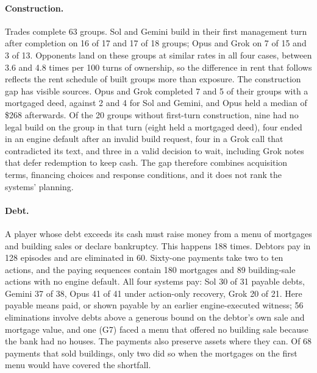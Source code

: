 \documentclass[11pt,letterpaper]{article}
\begin{document}
\paragraph{Construction.} Trades complete 63 groups. Sol and Gemini build in their first management turn after completion on 16 of 17 and 17 of 18 groups; Opus and Grok on 7 of 15 and 3 of 13. Opponents land on these groups at similar rates in all four cases, between 3.6 and 4.8 times per 100 turns of ownership, so the difference in rent that follows reflects the rent schedule of built groups more than exposure. The construction gap has visible sources. Opus and Grok completed 7 and 5 of their groups with a mortgaged deed, against 2 and 4 for Sol and Gemini, and Opus held a median of \$268 afterwards. Of the 20 groups without first-turn construction, nine had no legal build on the group in that turn (eight held a mortgaged deed), four ended in an engine default after an invalid build request, four in a Grok call that contradicted its text, and three in a valid decision to wait, including Grok notes that defer redemption to keep cash. The gap therefore combines acquisition terms, financing choices and response conditions, and it does not rank the systems' planning.

\paragraph{Debt.}\label{sec:finance} A player whose debt exceeds its cash must raise money from a menu of mortgages and building sales or declare bankruptcy. This happens 188 times. Debtors pay in 128 episodes and are eliminated in 60. Sixty-one payments take two to ten actions, and the paying sequences contain 180 mortgages and 89 building-sale actions with no engine default. All four systems pay: Sol 30 of 31 payable debts, Gemini 37 of 38, Opus 41 of 41 under action-only recovery, Grok 20 of 21. Here payable means paid, or shown payable by an earlier engine-executed witness; 56 eliminations involve debts above a generous bound on the debtor's own sale and mortgage value, and one (G7) faced a menu that offered no building sale because the bank had no houses. The payments also preserve assets where they can. Of 68 payments that sold buildings, only two did so when the mortgages on the first menu would have covered the shortfall.
\end{document}
